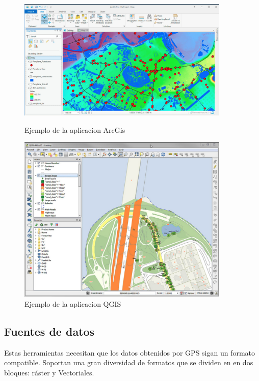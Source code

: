 \begin{figure}[!htb]
\begin{minipage}{0.48\textwidth}
\centering
\includegraphics[width=0.9\textwidth]{./Imagenes/ArcGIS.png}
\caption{Ejemplo de la aplicacion ArcGis}
\label{fig:ArcGis01}
\end{minipage}\hfill
\begin{minipage}{0.48\textwidth}
\centering
\includegraphics[width=0.9\textwidth]{./Imagenes/QGIS.png}
\caption{Ejemplo de la aplicacion QGIS}
\label{fig:QGIS01}
\end{minipage}
\end{figure}
\newpage

\subsection{Fuentes de datos}
Estas herramientas necesitan que los datos obtenidos por \ac{GPS}  sigan un formato compatible. 
Soportan una gran diversidad de formatos que se dividen en en dos bloques: ráster y Vectoriales. 

